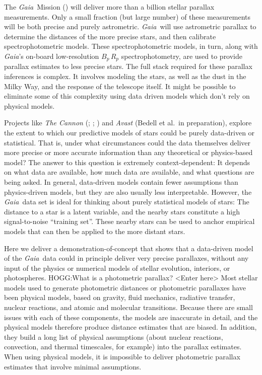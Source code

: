 \documentclass[modern]{aastex61}
\newcommand{\project}[1]{\textsl{#1}}
\newcommand{\gaia}{\project{Gaia}}
\begin{document}
The \gaia\ Mission (\citealt{gaia16}) will deliver more than a billion stellar parallax measurements.
Only a small fraction (but large number) of these
measurements will be both precise and purely astrometric.
\gaia\ will use astrometric parallax to determine the distances of the more precise
stars, and then calibrate spectrophotometric models.
These spectrophotometric models, in turn, along with \gaia's on-board
low-resolution $B_p\,R_p$ spectrophotometry, are used to provide
parallax estimates to less precise stars.
The full stack required for these parallax inferences is complex.
It involves modeling the stars, as well as the dust in the Milky Way,
and the response of the telescope itself.
It might be possible to eliminate some of this complexity using data driven models which don't rely on physical models.

Projects like \project{The Cannon} (\citealt{ness15}; \citealt{casey17}; \citealt{ho17})
and \project{Avast} (Bedell et al.\ in preparation),
explore the extent to which our predictive models of
stars could be purely data-driven or statistical.
That is, under what circumstances could the data themselves deliver
more precise or more accurate information than any theoretical or
physics-based model?
The answer to this question is extremely context-dependent: It depends
on what data are available, how much data are available, and what
questions are being asked.
In general, data-driven models contain fewer assumptions than
physics-driven models, but they are also usually less interpretable.
However, the \gaia\ data set is ideal for thinking about purely statistical
models of stars:
The distance to a star is a latent variable, and the nearby
stars constitute a high signal-to-noise ``training set''.
These nearby stars can be used to anchor empirical models that can
then be applied to the more distant stars.

Here we deliver a demonstration-of-concept that shows that a
data-driven model of the \gaia\ data could in principle deliver very
precise parallaxes, without any input of the physics or numerical models of stellar
evolution, interiors, or photospheres.
HOGG:What is a photometric parallax? <Enter here>
Most stellar models used to generate photometric distances or photometric
parallaxes have been physical models, based on gravity, fluid mechanics,
radiative transfer, nuclear reactions, and atomic and molecular transitions.
Because there are small issues with each of these components, the models are inaccurate in detail, and
the physical models therefore produce distance estimates that are biased.
In addition, they build a long list of physical assumptions (about
nuclear reactions, convection, and thermal timescales, for example)
into the parallax estimates.
When using physical models, it is impossible to deliver photometric parallax estimates that involve minimal assumptions.
\end{document}

